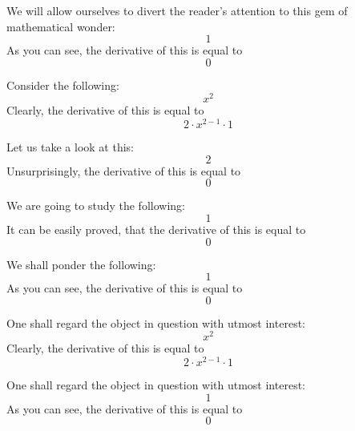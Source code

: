 \documentclass{article}
\begin{document}
We will allow ourselves to divert the reader's attention to this gem of mathematical wonder:
\begin{equation}
1 
\end{equation}
As you can see, the derivative of this is equal to
\begin{equation}
0 
\end{equation}

Consider the following:
\begin{equation}
x ^{2 } 
\end{equation}
Clearly, the derivative of this is equal to
\begin{equation}
2 \cdot x ^{2 - 1 } \cdot 1 
\end{equation}

Let us take a look at this:
\begin{equation}
2 
\end{equation}
Unsurprisingly, the derivative of this is equal to
\begin{equation}
0 
\end{equation}

We are going to study the following:
\begin{equation}
1 
\end{equation}
It can be easily proved, that the derivative of this is equal to
\begin{equation}
0 
\end{equation}

We shall ponder the following:
\begin{equation}
1 
\end{equation}
As you can see, the derivative of this is equal to
\begin{equation}
0 
\end{equation}

One shall regard the object in question with utmost interest:
\begin{equation}
x ^{2 } 
\end{equation}
Clearly, the derivative of this is equal to
\begin{equation}
2 \cdot x ^{2 - 1 } \cdot 1 
\end{equation}

One shall regard the object in question with utmost interest:
\begin{equation}
1 
\end{equation}
As you can see, the derivative of this is equal to
\begin{equation}
0 
\end{equation}
\end{document}
